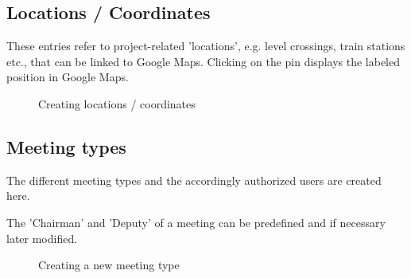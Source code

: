 \subsection{Locations / Coordinates}

These entries refer to project-related 'locations', e.g. level crossings, train stations etc., that can be linked to Google Maps. Clicking on the pin displays the labeled position in Google Maps.

\begin{figure}[H]
\caption{Creating locations / coordinates}
\end{figure}

\clearpage
\subsection{Meeting types}

The different meeting types and the accordingly authorized users are created here.

\vspace{\baselineskip}


The 'Chairman' and 'Deputy' of a meeting can be predefined and if necessary 
later modified.

\begin{figure}[H]
\caption{Creating a new meeting type}
\end{figure}

